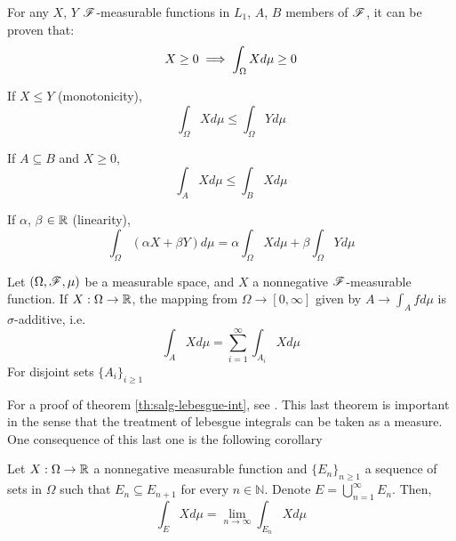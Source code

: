 \documentclass[../TGMAFFIRO.tex]{subfiles}
\begin{document}
\begin{proposition} \label{prop:lebesgue_integral_props}
	For any $X$, $Y$ $\mathscr{F}$-measurable functions in $L_1$, $A$, $B$ members of $\mathscr{F}$, it can be proven that:
	\begin{equation}
		X \geq 0 \implies \int_\Omega X d\mu \geq 0 \\
	\end{equation}
	
	If $X \leq Y$ (monotonicity),
	\begin{equation}
		\int_\Omega X d\mu \leq \int_\Omega Y d\mu
	\end{equation}
	
	If $A \subseteq B$ and $X \geq 0$,
	\begin{equation}
		\int_A X d\mu \leq \int_B X d\mu
	\end{equation}
	
	If $\alpha$, $\beta$ $\in \mathbb{R}$ (linearity),
	\begin{equation}
	\int_\Omega (\alpha X + \beta Y) d\mu = \alpha \int_\Omega X d\mu + \beta \int_\Omega Y d\mu
	\end{equation}
\end{proposition}

\begin{theorem} \label{th:salg-lebesgue-int}
	Let $(\Omega, \mathscr{F}, \mu)$ be a measurable space, and $X$ a nonnegative $\mathscr{F}$-measurable function. If $X: \Omega \to \mathbb{R}$, the mapping from $\Omega \to [0, \infty]$ given by $A \to \int_A f d\mu$ is $\sigma$-additive, i.e.
	\begin{equation}
		\int_A X d\mu = \sum_{i=1}^{\infty}\int_{A_i} X d\mu
	\end{equation}
	For disjoint sets $\{A_i\}_{i\geq1}$
\end{theorem}

For a proof of theorem \ref{th:salg-lebesgue-int}, see . This last theorem is important in the sense that the treatment of lebesgue integrals can be taken as a measure. One consequence of this last one is the following corollary

\begin{corollary} \label{cor:partition_limit_integral}
	Let $X: \Omega \to \mathbb{R}$ a nonnegative measurable function and $\{E_n\}_{n\geq 1}$ a sequence of sets in $\Omega$ such that $E_n \subseteq E_{n+1}$ for every $n \in \mathbb{N}$. Denote $E = \bigcup_{n=1}^{\infty} E_n$. Then,
	\begin{equation}
		\int_E X d\mu = \lim_{n\to \infty} \int_{E_n} X d\mu
	\end{equation}
\end{corollary}
\end{document}
